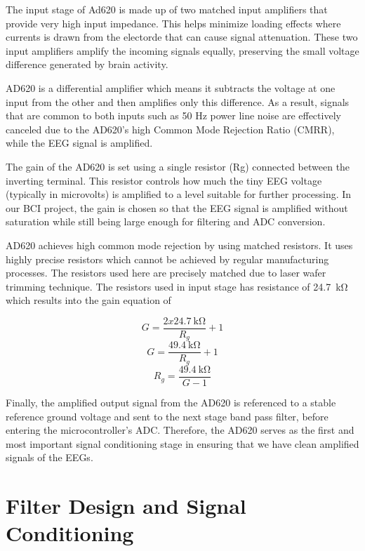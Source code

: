 The input stage of Ad620 is made up of two matched input amplifiers that provide very high input impedance. This helps minimize loading effects where currents is drawn from the electorde that can cause signal attenuation. These two input amplifiers amplify the incoming signals equally, preserving the small voltage difference generated by brain activity.

AD620 is a differential amplifier which means it subtracts the voltage at one input from the other and then amplifies only this difference. As a result, signals that are common to both inputs such as 50 Hz power line noise are effectively canceled due to the AD620’s high Common Mode Rejection Ratio (CMRR), while the EEG signal is amplified.

The gain of the AD620 is set using a single resistor (Rg) connected between the inverting terminal. This resistor controls how much the tiny EEG voltage (typically in microvolts) is amplified to a level suitable for further processing. In our BCI project, the gain is chosen so that the EEG signal is amplified without saturation while still being large enough for filtering and ADC conversion.

AD620 achieves high common mode rejection by using matched resistors. It uses highly precise resistors which cannot be achieved by regular manufacturing processes. The resistors used here are precisely matched due to laser wafer trimming technique. The resistors used in input stage has resistance of \SI{24.7}{\kilo\ohm} which results into the gain equation of 

$$G = \frac{2x\SI{24.7}{\kilo\ohm}}{R_g} + 1$$
\begin{equation}
	G = \frac{\SI{49.4}{\kilo\ohm}}{R_g} + 1
\end{equation}
\begin{equation}
	R_g = \frac{\SI{49.4}{\kilo\ohm}}{G-1}
\end{equation}

Finally, the amplified output signal from the AD620 is referenced to a stable reference ground voltage and sent to the next stage band pass filter, before entering the microcontroller’s ADC. Therefore, the AD620 serves as the first and most important signal conditioning stage in ensuring that we have clean amplified signals of the EEGs.

\section{Filter Design and Signal Conditioning}
